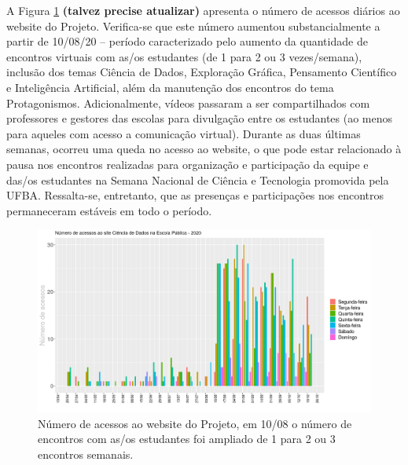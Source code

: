 \documentclass[
]{book}
\begin{document}
A Figura \ref{fig:sitevisita} \textbf{(talvez precise atualizar)}
apresenta o número de acessos diários ao website do Projeto.
Verifica-se que este número aumentou substancialmente a partir de
10/08/20 -- período caracterizado pelo aumento da quantidade de
encontros virtuais com as/os estudantes (de 1 para 2 ou 3
vezes/semana), inclusão dos temas Ciência de Dados, Exploração
Gráfica, Pensamento Científico e Inteligência Artificial, além da
manutenção dos encontros do tema Protagonismos. Adicionalmente, vídeos
passaram a ser compartilhados com professores e gestores das escolas
para divulgação entre os estudantes (ao menos para aqueles com acesso
a comunicação virtual). Durante as duas últimas semanas, ocorreu uma
queda no acesso ao website, o que pode estar relacionado à pausa nos
encontros realizadas para organização e participação da equipe e
das/os estudantes na Semana Nacional de Ciência e Tecnologia promovida
pela UFBA. Ressalta-se, entretanto, que as presenças e participações
nos encontros permaneceram estáveis em todo o período.

\begin{figure}

{\centering \includegraphics[width=1\linewidth,height=0.8\textheight]{images/image17} 

}

\caption{Número de acessos ao website do Projeto, em 10/08 o número de encontros com as/os estudantes foi ampliado de 1 para 2 ou 3 encontros semanais.}\label{fig:sitevisita}
\end{figure}
\end{document}
